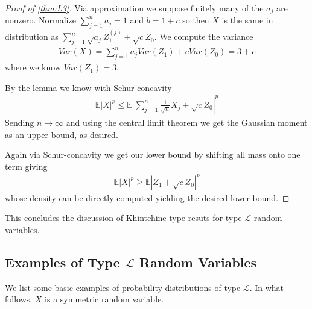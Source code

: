 \documentclass[10pt]{article}
\newcommand{\E}{\mathbb{E}}
\newcommand{\1}{\textbf{1}}
\theoremstyle{remark}
\theoremstyle{definition}
\begin{document}
\begin{proof}[Proof of \ref{thm:L3}]


	Via approximation we suppose finitely many of the $a_j$ are nonzero. Normalize $\sum_{j=1}^n a_j = 1$ and $b = 1+c$ so then $X$ is the same in distribution as $\sum_{j=1}^n \sqrt{a_j}Z_1^{(j)} + \sqrt{c}Z_0$. We compute the variance
	\begin{align*}
		Var(X) = \sum_{j=1}^na_jVar(Z_1) + cVar(Z_0) = 3+c
	\end{align*}
	where we know $Var(Z_1) = 3$. 

	By the lemma we know with Schur-concavity
	\begin{align*}
		\E |X|^p \leq \E|\sum_{j=1}^n \frac{1}{\sqrt{n}} X_j + \sqrt{c}Z_0|^p
	\end{align*}
	Sending $n \to \infty$ and using the central limit theorem we get the Gaussian moment as an upper bound, as desired. 

	Again via Schur-concavity we get our lower bound by shifting all mass onto one term giving
	\begin{align*}
		\E |X|^p \geq \E |Z_1 + \sqrt{c}Z_0|^p
	\end{align*}
	whose density can be directly computed yielding the desired lower bound.
\end{proof}

This concludes the discussion of Khintchine-type resuts for type $\mathcal{L}$ random variables.

\subsection{Examples of Type $\mathcal{L}$ Random Variables}

We list some basic examples of probability distributions of type $\mathcal{L}$. In what follows, $X$ is a symmetric random variable.
\end{document}
